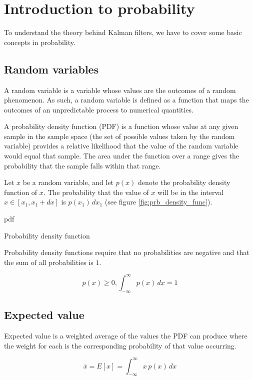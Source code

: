 \section{Introduction to probability}

To understand the theory behind Kalman filters, we have to cover some basic
concepts in probability.

\subsection{Random variables}

A random variable is a variable whose values are the outcomes of a random
phenomenon. As such, a random variable is defined as a function that maps the
outcomes of an unpredictable process to numerical quantities.

A probability density function (PDF) is a function whose value at any given
sample in the sample space (the set of possible values taken by the random
variable) provides a relative likelihood that the value of the random variable
would equal that sample. The area under the function over a range gives the
probability that the sample falls within that range.

Let $x$ be a random variable, and let $p(x)$ denote the probability density
function of $x$. The probability that the value of $x$ will be in the interval
$x \in [x_1, x_1 + dx]$ is $p(x_1) \,dx_1$ (see figure
\ref{fig:prb_density_func}).

\begin{svg}{pdf}
  \caption{Probability density function}
  \label{fig:prb_density_func}
\end{svg}

Probability density functions require that no probabilities are negative and
that the sum of all probabilities is $1$.

\begin{equation*}
  p(x) \geq 0, \int_{-\infty}^\infty p(x) \,dx = 1
\end{equation*}

\subsection{Expected value}

Expected value is a weighted average of the values the PDF can produce where the
weight for each is the corresponding probability of that value occurring.

\begin{equation*}
  \overline{x} = E[x] = \int_{-\infty}^\infty x \,p(x) \,dx
\end{equation*}

